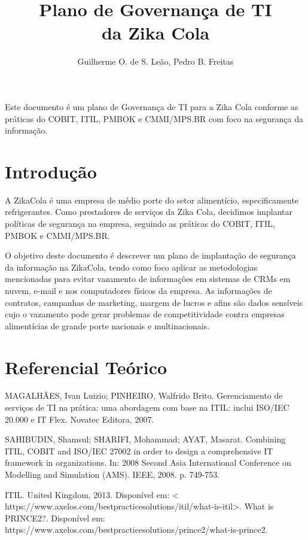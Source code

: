 \documentclass[12pt]{article}
\title{Plano de Governança de TI\\ da Zika Cola}
\author{Guilherme O. de S. Leão, Pedro B. Freitas}
\begin{document}
 

\maketitle
     
\begin{resumo} 
Este documento é um plano de Governança de TI para a Zika Cola conforme as práticas do COBIT, ITIL, PMBOK e CMMI/MPS.BR com foco na segurança da informação.
\end{resumo}


\section{Introdução}

A ZikaCola é uma empresa de médio porte do setor alimentício, especificamente refrigerantes. Como prestadores de serviços da Zika Cola, decidimos implantar políticas de segurança na empresa, seguindo as práticas do COBIT, ITIL, PMBOK e CMMI/MPS.BR.

O objetivo deste documento é descrever um plano de implantação de segurança da informação na ZikaCola, tendo como foco aplicar as metodologias mencionadas para evitar vazamento de informações em sistemas de CRMs em nuvem, e-mail e nos computadores físicos da empresa. As informações de contratos, campanhas de marketing, margem de lucros e afins são dados sensíveis cujo o vazamento pode gerar problemas de competitividade contra empresas alimentícias de grande porte nacionais e multinacionais.  


\section{Referencial Teórico} 

	MAGALHÃES, Ivan Luizio; PINHEIRO, Walfrido Brito. Gerenciamento de
serviços de TI na prática: uma abordagem com base na ITIL: inclui
ISO/IEC 20.000 e IT Flex. Novatec Editora, 2007.

SAHIBUDIN, Shamsul; SHARIFI, Mohammad; AYAT, Masarat. Combining
ITIL, COBIT and ISO/IEC 27002 in order to design a comprehensive IT
framework in organizations. In: 2008 Second Asia International
Conference on Modelling and Simulation (AMS). IEEE, 2008. p. 749-753.

ITIL. United Kingdom, 2013. Disponível em: < https://www.axelos.com/bestpracticesolutions/itil/what-is-itil>. What is PRINCE2?. Disponível em: https://www.axelos.com/bestpracticesolutions/prince2/what-is-prince2.
\end{document}
